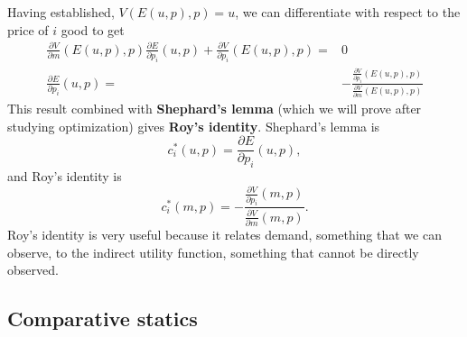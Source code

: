 \documentclass[12pt,reqno]{amsart}
\theoremstyle{definition}
\begin{document}
Having established, $V(E(u,p),p) = u$, we can differentiate with
respect to the price of $i$ good to get
\begin{align*}
  \frac{\partial V}{\partial m} (E(u,p),p) \frac{\partial E}{\partial
    p_i}(u,p) + \frac{\partial V}{\partial p_i} (E(u,p),p) = & 0 \\
  \frac{\partial E}{\partial
    p_i}(u,p) = & -\frac{\frac{\partial V}{\partial p_i} (E(u,p),p)}  
  {\frac{\partial V}{\partial m} (E(u,p),p)}
\end{align*}
This result combined with \textbf{Shephard's lemma} (which we will
prove after studying optimization) gives \textbf{Roy's identity}.
Shephard's lemma is
\[ c_i^*(u,p) =  \frac{\partial E}{\partial p_i}(u,p), \]
and Roy's identity is
\[ c_i^*(m,p) = -\frac{\frac{\partial V}{\partial p_i} (m,p)}
{\frac{\partial V}{\partial m} (m,p)}. \] 
Roy's identity is very useful because it relates demand, something
that we can observe, to the indirect utility function, something that
cannot be directly observed.

\subsection{Comparative statics}
\end{document}

